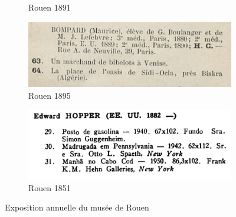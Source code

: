 \documentclass[a4paper,12pt,twoside]{book}
\begin{document}
\begin{figure}
\begin{subfigure}{0.5\textwidth}
		\centering
		\caption{Rouen 1891}
	\end{subfigure}
		\begin{subfigure}{0.5\textwidth}
		\includegraphics[scale=0.5]{rouen1895.png}
		\centering
		\caption{Rouen 1895}
	\end{subfigure}
		\begin{subfigure}{0.5\textwidth}
		\includegraphics[scale=0.5]{saopaulo1851.png}
		\centering
		\caption{Rouen 1851}
	\end{subfigure}
	\caption{Exposition annuelle du musée de Rouen}
	\end{figure}
	
	
	
\end{document}
